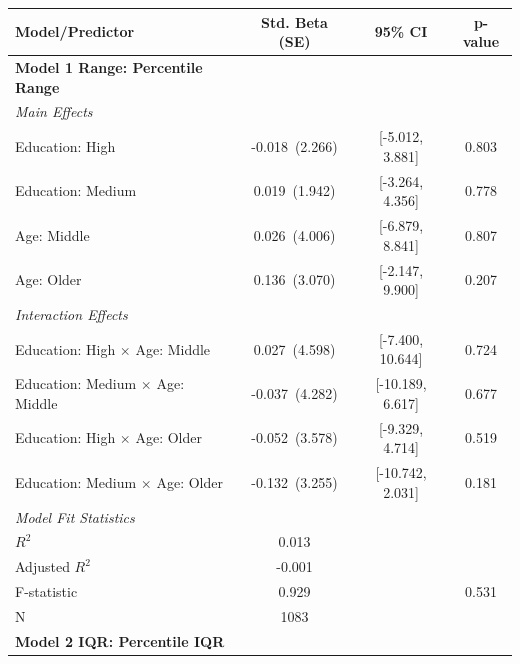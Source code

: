 \documentclass[11pt,a4paper]{article}
\begin{document}
\begin{table}[!htbp]
\centering
\renewcommand{\arraystretch}{1.1}
\begin{tabular}{p{5.5cm} c c c}
\toprule
\textbf{Model/Predictor} & \textbf{Std. Beta (SE)} & \textbf{95\% CI} & \textbf{p-value} \\
\midrule
\textbf{Model 1 Range: Percentile Range} & & & \\
\addlinespace[0.3em]
\textit{Main Effects} & & & \\
\addlinespace[0.3em]
\hspace{1.5em}Education: High & -0.018~(2.266) & {[-5.012, 3.881]} & 0.803 \\
\hspace{1.5em}Education: Medium & 0.019~(1.942) & {[-3.264, 4.356]} & 0.778 \\
\hspace{1.5em}Age: Middle & 0.026~(4.006) & {[-6.879, 8.841]} & 0.807 \\
\hspace{1.5em}Age: Older & 0.136~(3.070) & {[-2.147, 9.900]} & 0.207 \\
\textit{Interaction Effects} & & & \\
\addlinespace[0.3em]
\hspace{1.5em}Education: High $\times$ Age: Middle & 0.027~(4.598) & {[-7.400, 10.644]} & 0.724 \\
\hspace{1.5em}Education: Medium $\times$ Age: Middle & -0.037~(4.282) & {[-10.189, 6.617]} & 0.677 \\
\hspace{1.5em}Education: High $\times$ Age: Older & -0.052~(3.578) & {[-9.329, 4.714]} & 0.519 \\
\hspace{1.5em}Education: Medium $\times$ Age: Older & -0.132~(3.255) & {[-10.742, 2.031]} & 0.181 \\
\textit{Model Fit Statistics} & & & \\
\addlinespace[0.3em]
\hspace{1.5em}$R^2$ & 0.013 & & \\
\hspace{1.5em}Adjusted $R^2$ & -0.001 & & \\
\hspace{1.5em}F-statistic & 0.929 & & 0.531 \\
\hspace{1.5em}N & 1083 & & \\
\addlinespace[0.5em]
\textbf{Model 2 IQR: Percentile IQR} & & & \\

\end{tabular}
\end{table}
\end{document}
